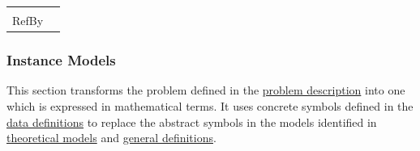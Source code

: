 \documentclass[12pt]{article}
\begin{document}
\begin{minipage}{\textwidth}
\begin{tabular}{>{\raggedright}p{}>{\raggedright\arraybackslash}p{}}
\\ \midrule \\
RefBy & 
\\ \bottomrule
\end{tabular}
\end{minipage}

\subsubsection{Instance Models}
\label{Sec:IMs}
This section transforms the problem defined in the \hyperref[Sec:ProbDesc]{problem description} into one which is expressed in mathematical terms. It uses concrete symbols defined in the \hyperref[Sec:DDs]{data definitions} to replace the abstract symbols in the models identified in \hyperref[Sec:TMs]{theoretical models} and \hyperref[Sec:GDs]{general definitions}.
\end{document}
